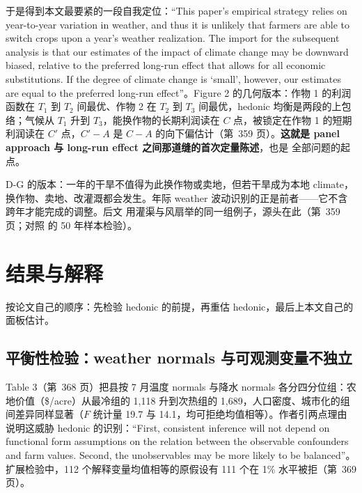 于是得到本文最要紧的一段自我定位：``This paper's empirical strategy relies on year-to-year variation in weather, and thus it is unlikely that farmers are able to switch crops upon a year's weather realization. The import for the subsequent analysis is that our estimates of the impact of climate change may be downward biased, relative to the preferred long-run effect that allows for all economic substitutions. If the degree of climate change is `small', however, our estimates are equal to the preferred long-run effect''\citep[第~359 页]{deschenes2007economic}。Figure 2 的几何版本：作物 1 的利润函数在 $T_1$ 到 $T_2$ 间最优、作物 2 在 $T_2$ 到 $T_3$ 间最优，hedonic 均衡是两段的上包络；气候从 $T_1$ 升到 $T_3$，能换作物的长期利润读在 $C$ 点，被锁定在作物 1 的短期利润读在 $C'$ 点，$C'-A$ 是 $C-A$ 的向下偏估计（第~359 页）。\textbf{这就是 panel approach 与 long-run effect 之间那道缝的首次定量陈述}，也是  全部问题的起点。

\begin{intuition}
D-G 的版本：一年的干旱不值得为此换作物或卖地，但若干旱成为本地 climate，换作物、卖地、改灌溉都会发生。年际 weather 波动识别的正是前者——它不含跨年才能完成的调整。后文  用灌渠与风扇举的同一组例子，源头在此（第~359 页；对照  的 50 年样本检验）。
\end{intuition}

\section{结果与解释}

按论文自己的顺序：先检验 hedonic 的前提，再重估 hedonic，最后上本文自己的面板估计。

\subsection{平衡性检验：weather normals 与可观测变量不独立}

Table 3（第~368 页）把县按 7 月温度 normals 与降水 normals 各分四分位组：农地价值（\$/acre）从最冷组的 1{,}118 升到次热组的 1{,}689，人口密度、城市化的组间差异同样显著（$F$ 统计量 19.7 与 14.1，均可拒绝均值相等）。作者引两点理由说明这威胁 hedonic 的识别：``First, consistent inference will not depend on functional form assumptions on the relation between the observable confounders and farm values. Second, the unobservables may be more likely to be balanced''\citep[第~368 页]{deschenes2007economic}。扩展检验中，112 个解释变量均值相等的原假设有 111 个在 1\% 水平被拒（第~369 页）。

